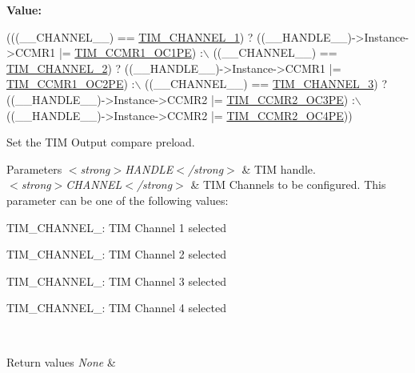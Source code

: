 {\bfseries Value\+:}
\begin{DoxyCode}
(((\_\_CHANNEL\_\_) == \hyperlink{group___t_i_m___channel_ga6b1541e4a49d62610899e24bf23f4879}{TIM\_CHANNEL\_1}) ? ((\_\_HANDLE\_\_)->Instance->CCMR1 |= 
      \hyperlink{group___peripheral___registers___bits___definition_ga1aa54ddf87a4b339881a8d5368ec80eb}{TIM\_CCMR1\_OC1PE}) :\(\backslash\)
         ((\_\_CHANNEL\_\_) == \hyperlink{group___t_i_m___channel_ga33e02d43345a7ac5886f01b39e4f7ccd}{TIM\_CHANNEL\_2}) ? ((\_\_HANDLE\_\_)->Instance->CCMR1 |= 
      \hyperlink{group___peripheral___registers___bits___definition_gabddbf508732039730125ab3e87e9d370}{TIM\_CCMR1\_OC2PE}) :\(\backslash\)
         ((\_\_CHANNEL\_\_) == \hyperlink{group___t_i_m___channel_ga4ea100c1789b178f3cb46721b7257e2d}{TIM\_CHANNEL\_3}) ? ((\_\_HANDLE\_\_)->Instance->CCMR2 |= 
      \hyperlink{group___peripheral___registers___bits___definition_ga276fd2250d2b085b73ef51cb4c099d24}{TIM\_CCMR2\_OC3PE}) :\(\backslash\)
         ((\_\_HANDLE\_\_)->Instance->CCMR2 |= \hyperlink{group___peripheral___registers___bits___definition_ga3e951cd3f6593e321cf79b662a1deaaa}{TIM\_CCMR2\_OC4PE}))
\end{DoxyCode}


Set the T\+IM Output compare preload. 


\begin{DoxyParams}{Parameters}
{\em $<$strong$>$\+H\+A\+N\+D\+L\+E$<$/strong$>$} & T\+IM handle. \\
\hline
{\em $<$strong$>$\+C\+H\+A\+N\+N\+E\+L$<$/strong$>$} & T\+IM Channels to be configured. This parameter can be one of the following values\+: \begin{DoxyItemize}
\item T\+I\+M\+\_\+\+C\+H\+A\+N\+N\+E\+L\+\_\+: T\+IM Channel 1 selected \item T\+I\+M\+\_\+\+C\+H\+A\+N\+N\+E\+L\+\_\+: T\+IM Channel 2 selected \item T\+I\+M\+\_\+\+C\+H\+A\+N\+N\+E\+L\+\_\+: T\+IM Channel 3 selected \item T\+I\+M\+\_\+\+C\+H\+A\+N\+N\+E\+L\+\_\+: T\+IM Channel 4 selected \end{DoxyItemize}
\\
\hline
\end{DoxyParams}

\begin{DoxyRetVals}{Return values}
{\em None} & \\
\hline
\end{DoxyRetVals}
\mbox{\label{group___t_i_m___exported___macros_gaa7a5c7645695bad15bacd402513a028a}} 
